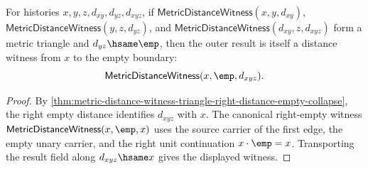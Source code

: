 \begin{theorem}
\label{thm:metric-distance-witness-triangle-right-empty-boundary-witness}
For histories $x,y,z,d_{xy},d_{yz},d_{xyz}$, if
$\mathsf{MetricDistanceWitness}(x,y,d_{xy})$,
$\mathsf{MetricDistanceWitness}(y,z,d_{yz})$, and
$\mathsf{MetricDistanceWitness}(d_{xy},z,d_{xyz})$ form a metric triangle and
$d_{yz}\hsame\emp$, then the outer result is itself a distance witness from
$x$ to the empty boundary:
$$
\mathsf{MetricDistanceWitness}(x,\emp,d_{xyz}).
$$
\end{theorem}
\begin{proof}
By \autoref{thm:metric-distance-witness-triangle-right-distance-empty-collapse},
the right empty distance identifies $d_{xyz}$ with $x$. The canonical
right-empty witness $\mathsf{MetricDistanceWitness}(x,\emp,x)$ uses the source
carrier of the first edge, the empty unary carrier, and the right unit
continuation $x\cdot\emp=x$. Transporting the result field along
$d_{xyz}\hsame x$ gives the displayed witness.
\end{proof}

